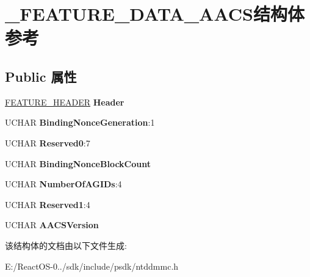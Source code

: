 \hypertarget{struct___f_e_a_t_u_r_e___d_a_t_a___a_a_c_s}{}\section{\+\_\+\+F\+E\+A\+T\+U\+R\+E\+\_\+\+D\+A\+T\+A\+\_\+\+A\+A\+C\+S结构体 参考}
\label{struct___f_e_a_t_u_r_e___d_a_t_a___a_a_c_s}
\subsection*{Public 属性}
\begin{DoxyCompactItemize}
\item 
\mbox{\label{struct___f_e_a_t_u_r_e___d_a_t_a___a_a_c_s_ae6727d6a5f2609c9d5631f70bdcbb54c}} 
\hyperlink{struct___f_e_a_t_u_r_e___h_e_a_d_e_r}{F\+E\+A\+T\+U\+R\+E\+\_\+\+H\+E\+A\+D\+ER} {\bfseries Header}
\item 
\mbox{\label{struct___f_e_a_t_u_r_e___d_a_t_a___a_a_c_s_abe291410b7b445bcfcf528e75bdb2958}} 
U\+C\+H\+AR {\bfseries Binding\+Nonce\+Generation}\+:1
\item 
\mbox{\label{struct___f_e_a_t_u_r_e___d_a_t_a___a_a_c_s_a631578670f2d4bc95fc49e2561d8898f}} 
U\+C\+H\+AR {\bfseries Reserved0}\+:7
\item 
\mbox{\label{struct___f_e_a_t_u_r_e___d_a_t_a___a_a_c_s_af3661c462dde658c133cff2f514a014d}} 
U\+C\+H\+AR {\bfseries Binding\+Nonce\+Block\+Count}
\item 
\mbox{\label{struct___f_e_a_t_u_r_e___d_a_t_a___a_a_c_s_a4129dc574a8a2c68c7cc51963e19e055}} 
U\+C\+H\+AR {\bfseries Number\+Of\+A\+G\+I\+Ds}\+:4
\item 
\mbox{\label{struct___f_e_a_t_u_r_e___d_a_t_a___a_a_c_s_ab6bc127786318cb4735acf36c82a2ff7}} 
U\+C\+H\+AR {\bfseries Reserved1}\+:4
\item 
\mbox{\label{struct___f_e_a_t_u_r_e___d_a_t_a___a_a_c_s_a5ced1b964c8682afca3a5e27a1a1180d}} 
U\+C\+H\+AR {\bfseries A\+A\+C\+S\+Version}
\end{DoxyCompactItemize}


该结构体的文档由以下文件生成\+:\begin{DoxyCompactItemize}
\item 
E\+:/\+React\+O\+S-\/0../sdk/include/psdk/ntddmmc.\+h\end{DoxyCompactItemize}
